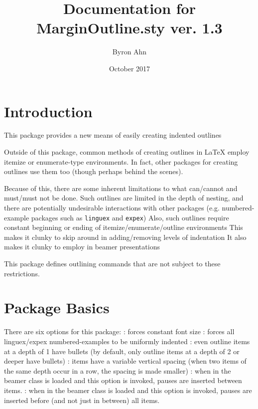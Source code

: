 \documentclass[11pt]{article}
\begin{document}
           
\title{Documentation for MarginOutline.sty ver. 1.3}
\author{Byron Ahn\footnotemark}
\date{October 2017}
\maketitle
{} 

\section{Introduction}
\1 This package provides a new means of easily creating indented outlines

\1 Outside of this package, common methods of creating outlines in LaTeX employ itemize or enumerate-type environments.
	\2 In fact, other packages for creating outlines use them too (though perhaps behind the scenes).

\1 Because of this, there are some inherent limitations to what can/cannot and must/must not be done.
	\2 Such outlines are limited in the depth of nesting, and there are potentially undesirable interactions with other packages (e.g. numbered-example packages such as \verb+linguex+ and \verb+expex+)
	\2 Also, such outlines require constant beginning or ending of itemize/enumerate/outline environments
		\3 This makes it clunky to skip around in adding/removing levels of indentation
		\3 It also makes it clunky to employ in beamer presentations

\1 This package defines outlining commands that are not subject to these restrictions.


\section{Package Basics}
\1 There are six options for this package:
	:	forces constant font size
	:	forces all linguex/expex numbered-examples to be uniformly indented
	:	even outline items at a depth of 1 have bullets (by default, only outline items at a depth of 2 or deeper have bullets)
	:	items have a variable vertical spacing (when two items of the same depth occur in a row, the spacing is made smaller)
	:	when in the beamer class is loaded and this option is invoked, pauses are inserted between items.
	:	when in the beamer class is loaded and this option is invoked, pauses are inserted before (and not just in between) all items.
\end{document}
